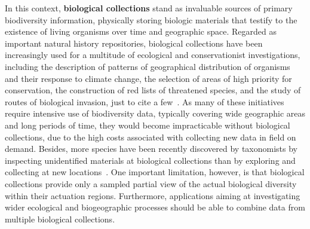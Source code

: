 In this context, \textbf{biological collections} stand as invaluable sources of primary biodiversity information, physically storing biologic materials that testify to the existence of living organisms over time and geographic space.
Regarded as important natural history repositories, biological collections have been increasingly used for a multitude of ecological and conservationist investigations, including the description of patterns of geographical distribution of organisms and their response to climate change, the selection of areas of high priority for conservation, the construction of red lists of threatened species, and the study of routes of biological invasion, just to cite a few~\cite{Pyke2010, Nualart2017,Kemp2015,Chapman2005b}. %
As many of these initiatives require intensive use of biodiversity data, typically covering wide geographic areas and long periods of time, they would become impracticable without biological collections, due to the high costs associated with collecting new data in field on demand.
Besides, more species have been recently discovered by taxonomists by inspecting unidentified materials at biological collections than by exploring and collecting at new locations~\cite{Kemp2015}.
%
One important limitation, however, is that biological collections provide only a sampled partial view of the actual biological diversity within their actuation regions. Furthermore, applications aiming at investigating wider ecological and biogeographic processes should be able to combine data from multiple biological collections.

